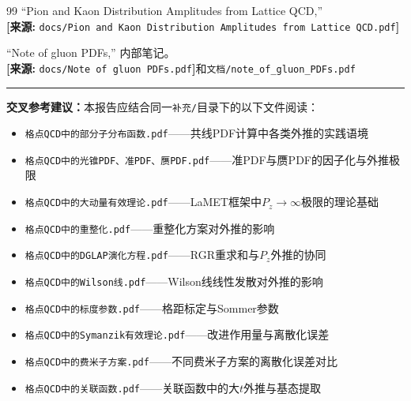\documentclass[12pt,a4paper]{ctexart}
\theoremstyle{definition}
\begin{document}
\begin{thebibliography}{99}
``Pion and Kaon Distribution Amplitudes from Lattice QCD,''
\\\textbf{[来源:} \texttt{docs/Pion and Kaon Distribution Amplitudes from Lattice QCD.pdf}\textbf{]}

``Note of gluon PDFs,'' 内部笔记。
\\\textbf{[来源:} \texttt{docs/Note of gluon PDFs.pdf}\textbf{]}和\texttt{文档/note\_of\_gluon\_PDFs.pdf}

\end{thebibliography}

\vspace{0.5cm}
\noindent\rule{\textwidth}{0.5pt}
\small
\textbf{交叉参考建议：}本报告应结合同一\texttt{补充/}目录下的以下文件阅读：
\begin{itemize}[nosep]
    \item \texttt{格点QCD中的部分子分布函数.pdf}——共线PDF计算中各类外推的实践语境
    \item \texttt{格点QCD中的光锥PDF、准PDF、赝PDF.pdf}——准PDF与赝PDF的因子化与外推极限
    \item \texttt{格点QCD中的大动量有效理论.pdf}——LaMET框架中$P_z\to\infty$极限的理论基础
    \item \texttt{格点QCD中的重整化.pdf}——重整化方案对外推的影响
    \item \texttt{格点QCD中的DGLAP演化方程.pdf}——RGR重求和与$P_z$外推的协同
    \item \texttt{格点QCD中的Wilson线.pdf}——Wilson线线性发散对外推的影响
    \item \texttt{格点QCD中的标度参数.pdf}——格距标定与Sommer参数
    \item \texttt{格点QCD中的Symanzik有效理论.pdf}——改进作用量与离散化误差
    \item \texttt{格点QCD中的费米子方案.pdf}——不同费米子方案的离散化误差对比
    \item \texttt{格点QCD中的关联函数.pdf}——关联函数中的大$t$外推与基态提取
\end{itemize}
\end{document}
